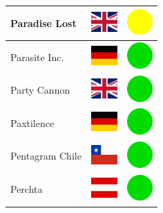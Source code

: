 \documentclass[12pt, a4paper, twoside]{report}
\begin{document}
\begin{center}
\begin{longtable}{|p{5cm}|p{2cm}|p{2cm}|}
 Paradise Lost                                              & \includegraphics[width=1cm]{../img/flags/gb} &   \includegraphics[width=1cm]{../likes/m} \\ \hline
 Parasite Inc.                                              & \includegraphics[width=1cm]{../img/flags/de} &   \includegraphics[width=1cm]{../likes/y} \\ \hline
 Party Cannon                                               & \includegraphics[width=1cm]{../img/flags/gb} &   \includegraphics[width=1cm]{../likes/y} \\ \hline
 Paxtilence                                                 & \includegraphics[width=1cm]{../img/flags/de} &   \includegraphics[width=1cm]{../likes/y} \\ \hline
 Pentagram Chile                                            & \includegraphics[width=1cm]{../img/flags/cl} &   \includegraphics[width=1cm]{../likes/y} \\ \hline
 Perchta                                                    & \includegraphics[width=1cm]{../img/flags/at} &   \includegraphics[width=1cm]{../likes/y} \\ \hline

\end{longtable}
\end{center}
\end{document}
